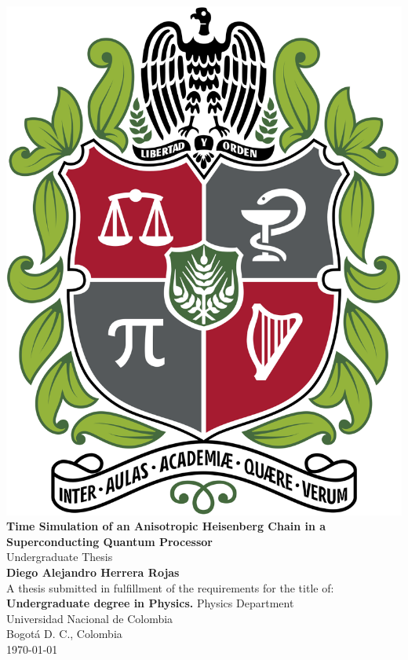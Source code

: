 \begin{titlepage}
  \begin{center}
    \vspace*{1cm}
    \includegraphics[scale=0.1]{Images/EscudoUnal.png}\\
    \vspace*{1cm}
    \huge
    \textbf{Time Simulation of an Anisotropic Heisenberg Chain in a Superconducting Quantum Processor}\\
    \vspace{0.5cm}
    \LARGE
    Undergraduate Thesis\\
    \vspace{1.5cm}
    \textbf{Diego Alejandro Herrera Rojas}\\
    \vfill
    \normalsize
    A thesis submitted in fulfillment of the requirements for the title of:\\
    \textbf{Undergraduate degree in Physics.}
    \vfill
    \large
    Physics Department\\
    Universidad Nacional de Colombia\\
    Bogotá D. C., Colombia\\
    \yeardate\today
  \end{center}
\end{titlepage}
